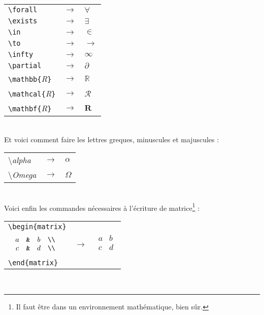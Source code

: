 \documentclass[11pt]{article}				%
\begin{document}
\begin{tabular}{lcl}

\verb?\forall? & $\rightarrow$ & $\forall$ \\
\verb?\exists? & $\rightarrow$ & $\exists$ \\
\verb?\in? & $\rightarrow$ & $\in$ \\
\verb?\to? & $\rightarrow$ & $\to$ \\
\verb?\infty? & $\rightarrow$ & $\infty$ \\
\verb?\partial? & $\rightarrow$ & $\partial$ \\
\verb?\mathbb{?\emph{R}\verb?}? & $\rightarrow$ & $\mathbb{R}$ \\
\verb?\mathcal{?\emph{R}\verb?}? & $\rightarrow$ & $\mathcal{R}$ \\
\verb?\mathbf{?\emph{R}\verb?}? & $\rightarrow$ & $\mathbf{R}$ \\

\end{tabular} \\


\noindent Et voici comment faire les lettres greques, minuscules et majuscules :
\begin{tabular}{lcl}

\textbackslash\emph{alpha} & $\rightarrow$ & $\alpha$ \\
\textbackslash\emph{Omega} & $\rightarrow$ & $\Omega$ \\

\end{tabular} \\


\noindent Voici enfin les commandes nécessaires à l'écriture de matrice\footnote{Il faut être dans un environnement mathématique, bien sûr.}\label{matrice} : \\

\begin{tabular}{lcl}

\verb?\begin{matrix}? & & \\

$\begin{matrix}
	 & a & \verb?&? & b & \verb?\\? \\
	 & c & \verb?&? & d & \verb?\\? \\
\end{matrix}$ & $\rightarrow$ & $\begin{matrix}
	a & b \\
	c & d \\
\end{matrix}$ \\

\verb?\end{matrix}? & &

\end{tabular} \\
\end{document}
